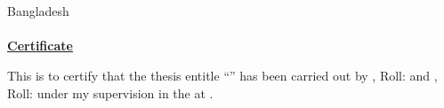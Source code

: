 \documentclass[../main.tex]{subfiles}
\begin{document}

\begin{center}
\begin{spacing}{1.5}
\vspace{-2\baselineskip}
{\monocorsiva{\tagline} }\\
\vspace{\baselineskip}
{\fontsize{18}{0cm} \selectfont \ruet \\ Bangladesh } \\
\bigskip
{\fontsize{16}{0cm} \selectfont \dept } \\
\bigskip
{\fontsize{16}{0cm} {\textbf{\underline{Certificate}} }}
\end{spacing}
\vspace{-0.5\baselineskip}
\end{center} 
\medskip
This is to certify that the thesis entitle “\thesisTitle” has been carried out by \authorA, Roll: \authorARoll\;and \authorB, Roll: \authorBRoll\;under my supervision in the \dept at \ruetBD.
\vspace{3\baselineskip} 
\end{document}
